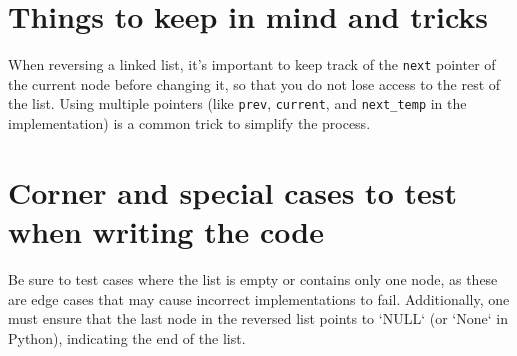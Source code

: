 \section*{Things to keep in mind and tricks}
When reversing a linked list, it's important to keep track of the \texttt{next} pointer of the current node before changing it, so that you do not lose access to the rest of the list. Using multiple pointers (like \texttt{prev}, \texttt{current}, and \texttt{next\_temp} in the implementation) is a common trick to simplify the process.


\section*{Corner and special cases to test when writing the code}
Be sure to test cases where the list is empty or contains only one node, as these are edge cases that may cause incorrect implementations to fail. Additionally, one must ensure that the last node in the reversed list points to `NULL` (or `None` in Python), indicating the end of the list.